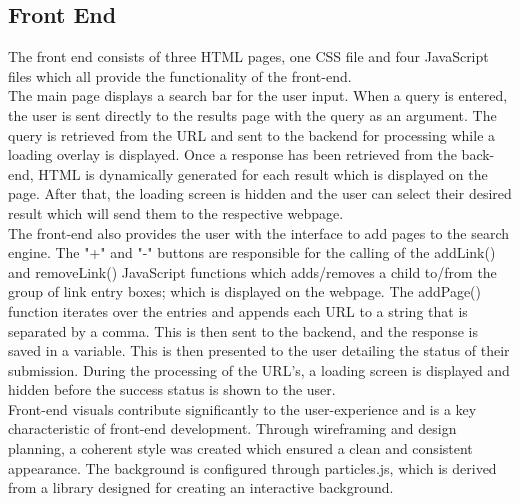 \subsection{Front End}
The front end consists of three HTML pages, one CSS file and four JavaScript files which all provide the functionality of the front-end.\\

The main page displays a search bar for the user input. When a query is entered, the user is sent directly to the results page with the query as an argument. The query is retrieved from the URL and sent to the backend for processing while a loading overlay is displayed. Once a response has been retrieved from the back-end, HTML is dynamically generated for each result which is displayed on the page. After that, the loading screen is hidden and the user can select their desired result which will send them to the respective webpage.\\

The front-end also provides the user with the interface to add pages to the search engine. The "+" and "-" buttons are responsible for the calling of the addLink() and removeLink() JavaScript functions which adds/removes a child to/from the group of link entry boxes; which is displayed on the webpage. The addPage() function iterates over the entries and appends each URL to a string that is separated by a comma. This is then sent to the backend, and the response is saved in a variable. This is then  presented to the user detailing the status of their submission. During the processing of the URL's, a loading screen is displayed and hidden before the success status is shown to the user.\\

Front-end visuals contribute significantly to the user-experience and is a key characteristic of front-end development. Through wireframing and design planning, a coherent style was created which ensured a clean and consistent appearance. The background is configured through particles.js, which is derived from a library designed for creating an interactive background.\\
